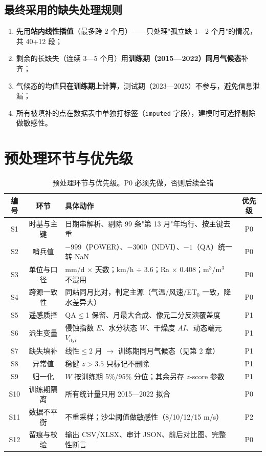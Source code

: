 \documentclass[11pt,a4paper]{ctexart}
\begin{document}
\subsection{最终采用的缺失处理规则}

\begin{enumerate}
\item 先用\textbf{站内线性插值}（最多跨 2 个月）——只处理"孤立缺 1—2 个月"的情况，共 40+12 段；
\item 剩余的长缺失（连续 3—5 个月）用\textbf{训练期（2015—2022）同月气候态}补齐；
\item 气候态的均值\textbf{只在训练期上计算}，测试期（2023—2025）不参与，避免信息泄漏；
\item 所有被填补的点在数据表中单独打标签（\texttt{imputed} 字段），建模时可选择剔除做敏感性。
\end{enumerate}

\section{预处理环节与优先级}

\begin{table}[H]\centering\footnotesize
\begin{tabularx}{\textwidth}{|c|c|X|c|}
\toprule
编号 & 环节 & 具体动作 & 优先级 \\
\midrule
S1 & 时基与主键 & 日期串解析、剔除 99 条"第 13 月"年均行、按主键去重 & P0 \\
S2 & 哨兵值 & $-999$（POWER）、$-3000$（NDVI）、$-1$（QA）统一转 NaN & P0 \\
S3 & 单位与口径 & mm/d $\times$ 天数；km/h $\div$ 3.6；Ra $\times$ 0.408；m$^3$/m$^3$ 不混用 & P0 \\
S4 & 跨源一致性 & 同站同月比对，判定主源（气温/风速/ET$_0$ 一致，降水差异大） & P0 \\
S5 & 遥感质控 & QA$\le$1 保留、月最大合成、像元二分反演覆盖度 & P1 \\
S6 & 派生变量 & 侵蚀指数 $E$、水分状态 $W$、干燥度 $AI$、动态端元 $V_{\mathrm{dyn}}$ & P1 \\
S7 & 缺失填补 & 线性$\le$2 月 $\to$ 训练期同月气候态（见第 2 章） & P1 \\
S8 & 异常值 & 稳健 $z>3.5$ 只标记不删除 & P1 \\
S9 & 归一化 & $W$ 按训练期 5\%/95\% 分位；其余另存 $z$-score 参数 & P1 \\
S10 & 训练期隔离 & 所有统计量只用 2015—2022 拟合 & P0 \\
S11 & 数据不平衡 & 不重采样；沙尘阈值做敏感性（8/10/12/15 m/s） & P2 \\
S12 & 留痕与校验 & 输出 CSV/XLSX、审计 JSON、前后对比图、完整性断言 & P0 \\
\bottomrule
\end{tabularx}
\caption{预处理环节与优先级。P0 必须先做，否则后续全错}
\end{table}
\end{document}
